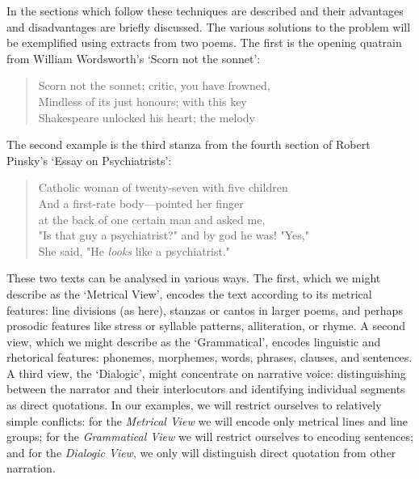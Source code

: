 In the sections which follow these techniques are described and their advantages and disadvantages are briefly discussed. The various solutions to the problem will be exemplified using extracts from two poems. The first is the opening quatrain from William Wordsworth's ‘Scorn not the sonnet’: \begin{quote}Scorn not the sonnet; critic, you have frowned,\\
	  Mindless of its just honours; with this key\\
	  Shakespeare unlocked his heart; the melody\\
	  
\end{quote} The second example is the third stanza from the fourth section of Robert Pinsky's ‘Essay on Psychiatrists’: \begin{quote}Catholic woman of twenty-seven with five children\\
	 And a first-rate body—pointed her finger\\
	 at the back of one certain man and asked me,\\
	 "Is that guy a psychiatrist?" and by god he was! "Yes,"\\
	 She said, "He \textit{looks} like a psychiatrist."\\
	 
\end{quote} These two texts can be analysed in various ways. The first, which we might describe as the ‘Metrical View’, encodes the text according to its metrical features: line divisions (as here), stanzas or cantos in larger poems, and perhaps prosodic features like stress or syllable patterns, alliteration, or rhyme. A second view, which we might describe as the ‘Grammatical’, encodes linguistic and rhetorical features: phonemes, morphemes, words, phrases, clauses, and sentences. A third view, the ‘Dialogic’, might concentrate on narrative voice: distinguishing between the narrator and their interlocutors and identifying individual segments as direct quotations. In our examples, we will restrict ourselves to relatively simple conflicts: for the \textit{Metrical View} we will encode only metrical lines and line groups; for the \textit{Grammatical View} we will restrict ourselves to encoding sentences; and for the \textit{Dialogic View}, we only will distinguish direct quotation from other narration.
